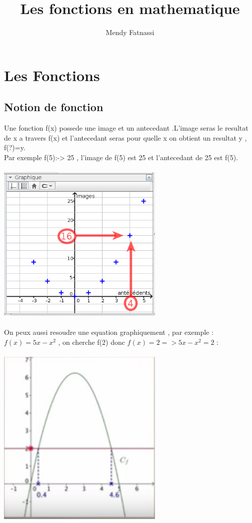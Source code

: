 \documentclass[a4paper,8pt,openany]{book}
\author{Mendy Fatnassi}
\title{Les fonctions en mathematique}
\begin{document}
\maketitle
\tableofcontents

\chapter{Les Fonctions}

\section{Notion de fonction}
Une fonction f(x) possede une image et un antecedant .L'image seras le resultat de x a travers f(x) et l'antecedant seras pour quelle x on obtient un resultat y , f(?)=y.\\
Par exemple f(5):-> 25 , l'image de f(5) est 25 et l'antecedant de 25 est f(5).\\
\\
\includegraphics[width=0.60\textwidth, center]{img/img_ant_graph.png}\\
\\
On peux aussi resoudre une equation graphiquement , par exemple :\\
$f(x) = 5x-x^2$ , on cherche f(2) donc $f(x)=2 => 5x-x^2=2$ :\\
\\
\includegraphics[width=0.60\textwidth, center]{img/resol_equ_graph.png}\\
\end{document}
